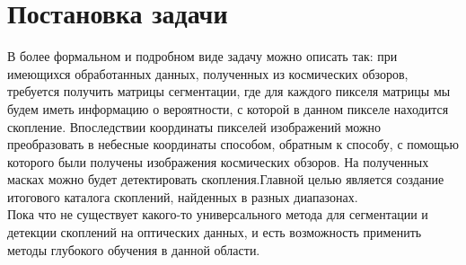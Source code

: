\chapter{Постановка задачи}
\label{cha:ch_1}

В более формальном и подробном виде задачу можно описать так: при имеющихся обработанных данных, 
полученных из космических обзоров, требуется получить матрицы сегментации, где для каждого пикселя 
матрицы мы будем иметь информацию о вероятности, с которой в данном пикселе находится скопление. 
Впоследствии координаты пикселей изображений можно преобразовать в небесные координаты способом, 
обратным к способу, с помощью которого были получены изображения космических обзоров. На полученных 
масках можно будет детектировать скопления.Главной целью является создание итогового каталога 
скоплений, найденных в разных диапазонах.\\

Пока что не существует какого-то универсального метода для сегментации и детекции скоплений 
на оптических данных, и есть возможность применить методы глубокого обучения в данной области.\\

